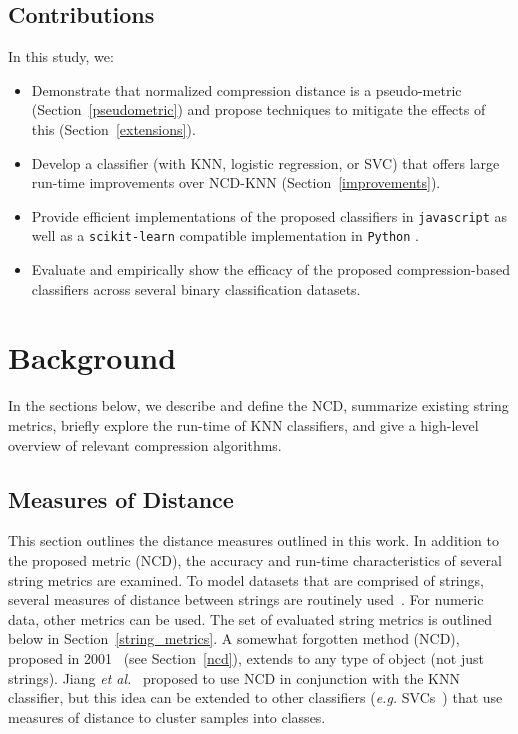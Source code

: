 \documentclass[preprint,12pt]{elsarticle}
\begin{document}
\subsection{Contributions}
In this study, we:

\begin{itemize}
    \item Demonstrate that normalized compression distance is a pseudo-metric (Section~\ref{pseudometric}) and propose techniques to mitigate the effects of this (Section~\ref{extensions}).
    \item Develop a classifier (with KNN, logistic regression, or SVC) that offers large run-time improvements over NCD-KNN (Section~\ref{improvements}).
    \item Provide efficient implementations of the proposed classifiers in \texttt{javascript} as well as a \texttt{scikit-learn} compatible implementation in \texttt{Python} .
    \item Evaluate and empirically show the efficacy of the proposed compression-based classifiers across several binary classification datasets.
\end{itemize}





\section{Background}

In the sections below, we describe and define the NCD, summarize existing string metrics, briefly explore the run-time of KNN classifiers, and give a high-level overview of relevant compression algorithms.



\subsection{Measures of Distance}

This section outlines the distance measures outlined in this work.
In addition to the proposed metric (NCD), the accuracy and run-time characteristics of several string metrics are examined.
To model datasets that are comprised of strings, several measures of distance between strings are routinely used~\cite{levenshtein}. 
For numeric data, other metrics can be used.
The set of evaluated string metrics is outlined below in Section~\ref{string_metrics}. 
A somewhat forgotten method (NCD), proposed in 2001~\cite{ncd} (see Section~\ref{ncd}), extends to any type of object (not just strings). 
Jiang \textit{et al.}~\cite{jiang2022less} proposed to use NCD in conjunction with the KNN classifier, but this idea can be extended to other classifiers (\textit{e.g.} SVCs~\cite{vapnik1994measuring}) that use measures of distance to cluster samples into classes.
\end{document}
